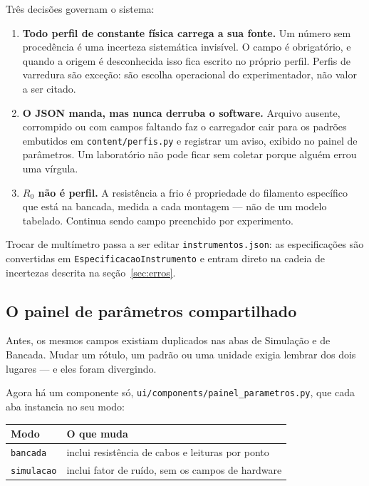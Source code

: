 \documentclass[11pt,a4paper]{article}
\newcommand{\arqv}[1]{\texttt{#1}}
\newcommand{\classe}[1]{\texttt{#1}}
\begin{document}
Três decisões governam o sistema:

\begin{enumerate}
  \item \textbf{Todo perfil de constante física carrega a sua fonte.} Um número
        sem procedência é uma incerteza sistemática invisível. O campo é
        obrigatório, e quando a origem é desconhecida isso fica escrito no
        próprio perfil. Perfis de varredura são exceção: são escolha
        operacional do experimentador, não valor a ser citado.

  \item \textbf{O JSON manda, mas nunca derruba o software.} Arquivo ausente,
        corrompido ou com campos faltando faz o carregador cair para os padrões
        embutidos em \arqv{content/perfis.py} e registrar um aviso, exibido no
        painel de parâmetros. Um laboratório não pode ficar sem coletar porque
        alguém errou uma vírgula.

  \item \textbf{$R_0$ não é perfil.} A resistência a frio é propriedade do
        filamento específico que está na bancada, medida a cada montagem --- não
        de um modelo tabelado. Continua sendo campo preenchido por experimento.
\end{enumerate}

Trocar de multímetro passa a ser editar \texttt{instrumentos.json}: as
especificações são convertidas em \classe{EspecificacaoInstrumento} e entram
direto na cadeia de incertezas descrita na seção~\ref{sec:erros}.

\subsection{O painel de parâmetros compartilhado}

Antes, os mesmos campos existiam duplicados nas abas de Simulação e de
Bancada. Mudar um rótulo, um padrão ou uma unidade exigia lembrar dos dois
lugares --- e eles foram divergindo.

Agora há um componente só, \arqv{ui/components/painel\_parametros.py}, que cada
aba instancia no seu modo:

\begin{center}
\begin{tabular}{@{}ll@{}}
\toprule
\textbf{Modo} & \textbf{O que muda} \\
\midrule
\texttt{bancada} & inclui resistência de cabos e leituras por ponto \\
\texttt{simulacao} & inclui fator de ruído, sem os campos de hardware \\
\bottomrule
\end{tabular}
\end{center}
\end{document}
